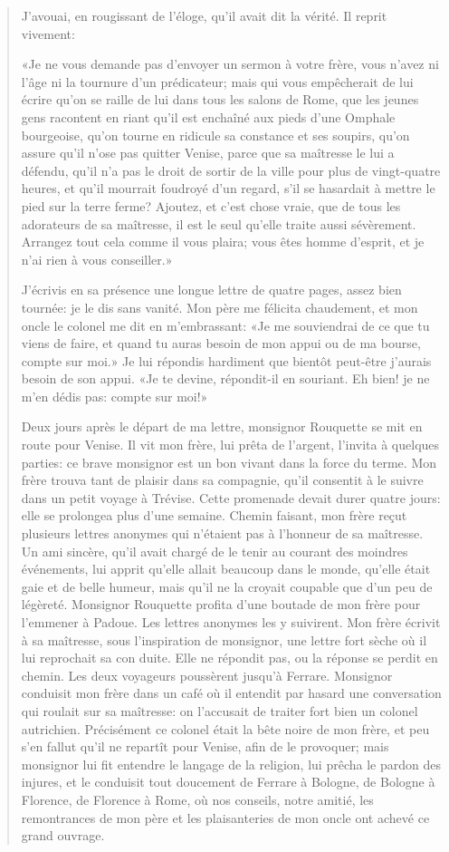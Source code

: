\begin{quote}
J'avouai, en rougissant de l'éloge, qu'il avait dit la vérité. Il reprit
vivement:

«Je ne vous demande pas d'envoyer un sermon à votre frère, vous n'avez
ni l'âge ni la tournure d'un prédicateur; mais qui vous empêcherait de
lui écrire qu'on se raille de lui dans tous les salons de Rome, que les
jeunes gens racontent en riant qu'il est enchaîné aux pieds d'une
Omphale bourgeoise, qu'on tourne en ridicule sa constance et ses
soupirs, qu'on assure qu'il n'ose pas quitter Venise, parce que sa
maîtresse le lui a défendu, qu'il n'a pas le droit de sortir de la ville
pour plus de vingt-quatre heures, et qu'il mourrait foudroyé d'un
regard, s'il se hasardait à mettre le pied sur la terre ferme? Ajoutez,
et c'est chose vraie, que de tous les adorateurs de sa maîtresse, il est
le seul qu'elle traite aussi sévèrement. Arrangez tout cela comme il
vous plaira; vous êtes homme d'esprit, et je n'ai rien à vous
conseiller.»

J'écrivis en sa présence une longue lettre de quatre pages, assez bien
tournée: je le dis sans vanité. Mon père me félicita chaudement, et mon
oncle le colonel me dit en m'embrassant: «Je me souviendrai de ce que tu
viens de faire, et quand tu auras besoin de mon appui ou de ma bourse,
compte sur moi.» Je lui répondis hardiment que bientôt peut-être
j'aurais besoin de son appui. «Je te devine, répondit-il en souriant. Eh
bien! je ne m'en dédis pas: compte sur moi!»

Deux jours après le départ de ma lettre, monsignor Rouquette se mit en
route pour Venise. Il vit mon frère, lui prêta de l'argent, l'invita à
quelques parties: ce brave monsignor est un bon vivant dans la force du
terme. Mon frère trouva tant de plaisir dans sa compagnie, qu'il
consentit à le suivre dans un petit voyage à Trévise. Cette promenade
devait durer quatre jours: elle se prolongea plus d'une semaine. Chemin
faisant, mon frère reçut plusieurs lettres anonymes qui n'étaient pas à
l'honneur de sa maîtresse. Un ami sincère, qu'il avait chargé de le
tenir au courant des moindres événements, lui apprit qu'elle allait
beaucoup dans le monde, qu'elle était gaie et de belle humeur, mais
qu'il ne la croyait coupable que d'un peu de légèreté. Monsignor
Rouquette profita d'une boutade de mon frère pour l'emmener à Padoue.
Les lettres anonymes les y suivirent. Mon frère écrivit à sa maîtresse,
sous l'inspiration de monsignor, une lettre fort sèche où il lui
reprochait sa con duite. Elle ne répondit pas, ou la réponse se perdit
en chemin. Les deux voyageurs poussèrent jusqu'à Ferrare. Monsignor
conduisit mon frère dans un café où il entendit par hasard une
conversation qui roulait sur sa maîtresse: on l'accusait de traiter fort
bien un colonel autrichien. Précisément ce colonel était la bête noire
de mon frère, et peu s'en fallut qu'il ne repartît pour Venise, afin de
le provoquer; mais monsignor lui fit entendre le langage de la religion,
lui prêcha le pardon des injures, et le conduisit tout doucement de
Ferrare à Bologne, de Bologne à Florence, de Florence à Rome, où nos
conseils, notre amitié, les remontrances de mon père et les
plaisanteries de mon oncle ont achevé ce grand ouvrage.


\end{quote}
